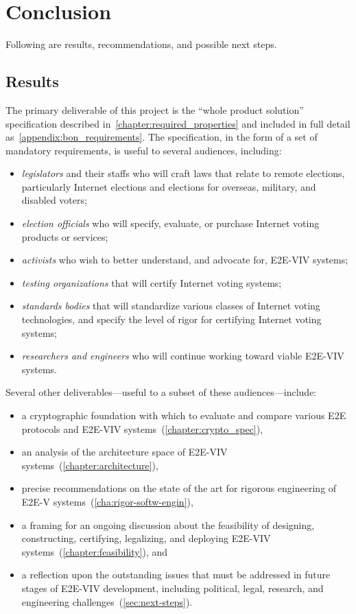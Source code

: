\chapter{Conclusion}
\label{chapter:conclusion}

Following are results, recommendations, and possible next steps.

\section{Results}

The primary deliverable of this project is the ``whole product
solution'' specification described
in~\autoref{chapter:required_properties} and included in full detail
as~\autoref{appendix:bon_requirements}. The specification, in the form
of a set of mandatory requirements, is useful to several audiences,
including:
\begin{itemize}
\item \emph{legislators} and their staffs who will craft laws that
  relate to remote elections, particularly Internet elections and
  elections for overseas, military, and disabled voters;
\item \emph{election officials} who will specify, evaluate, or
  purchase Internet voting products or services;
\item \emph{activists} who wish to better understand, and advocate
  for, E2E-VIV systems;
\item \emph{testing organizations} that will certify Internet voting
  systems;
\item \emph{standards bodies} that will standardize various classes of
  Internet voting technologies, and specify the level of rigor for
  certifying Internet voting systems;
\item \emph{researchers and engineers} who will continue working
  toward viable E2E-VIV systems.
\end{itemize}

Several other deliverables---useful to a subset of these
audiences---include:
\begin{itemize}
\item a cryptographic foundation with which to evaluate and compare
  various E2E protocols and E2E-VIV
  systems~(\autoref{chapter:crypto_spec}),
\item an analysis of the architecture space of E2E-VIV
  systems~(\autoref{chapter:architecture}),
\item precise recommendations on the state of the art for rigorous
  engineering of E2E-V systems~(\autoref{cha:rigor-softw-engin}),
\item a framing for an ongoing discussion about the feasibility of
  designing, constructing, certifying, legalizing, and deploying
  E2E-VIV systems~(\autoref{chapter:feasibility}), and
\item a reflection upon the outstanding issues that must be addressed
  in future stages of E2E-VIV development, including political, legal,
  research, and engineering challenges~(\autoref{sec:next-steps}).
\end{itemize}

